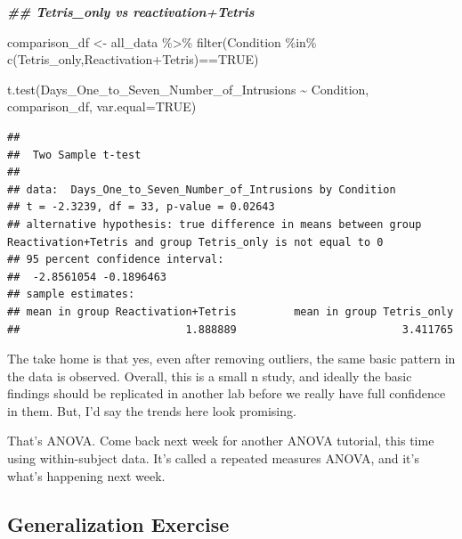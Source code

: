 \documentclass[
]{book}
\newenvironment{Shaded}{\begin{snugshade}}{\end{snugshade}}
\newcommand{\AttributeTok}[1]{\textcolor[rgb]{0.77,0.63,0.00}{#1}}
\newcommand{\ConstantTok}[1]{\textcolor[rgb]{0.00,0.00,0.00}{#1}}
\newcommand{\DocumentationTok}[1]{\textcolor[rgb]{0.56,0.35,0.01}{\textbf{\textit{#1}}}}
\newcommand{\FunctionTok}[1]{\textcolor[rgb]{0.00,0.00,0.00}{#1}}
\newcommand{\NormalTok}[1]{#1}
\newcommand{\OtherTok}[1]{\textcolor[rgb]{0.56,0.35,0.01}{#1}}
\newcommand{\SpecialCharTok}[1]{\textcolor[rgb]{0.00,0.00,0.00}{#1}}
\newcommand{\StringTok}[1]{\textcolor[rgb]{0.31,0.60,0.02}{#1}}
\begin{document}
\begin{Shaded}
\begin{Highlighting}[]
\DocumentationTok{\#\# Tetris\_only vs reactivation+Tetris}

\NormalTok{comparison\_df }\OtherTok{\textless{}{-}}\NormalTok{ all\_data }\SpecialCharTok{\%\textgreater{}\%} 
                  \FunctionTok{filter}\NormalTok{(Condition }\SpecialCharTok{\%in\%} \FunctionTok{c}\NormalTok{(}\StringTok{\textquotesingle{}Tetris\_only\textquotesingle{}}\NormalTok{,}\StringTok{\textquotesingle{}Reactivation+Tetris\textquotesingle{}}\NormalTok{)}\SpecialCharTok{==}\ConstantTok{TRUE}\NormalTok{)}
                        
\FunctionTok{t.test}\NormalTok{(Days\_One\_to\_Seven\_Number\_of\_Intrusions }\SpecialCharTok{\textasciitilde{}}\NormalTok{ Condition, }
\NormalTok{       comparison\_df,}
       \AttributeTok{var.equal=}\ConstantTok{TRUE}\NormalTok{)}
\end{Highlighting}
\end{Shaded}

\begin{verbatim}
## 
##  Two Sample t-test
## 
## data:  Days_One_to_Seven_Number_of_Intrusions by Condition
## t = -2.3239, df = 33, p-value = 0.02643
## alternative hypothesis: true difference in means between group Reactivation+Tetris and group Tetris_only is not equal to 0
## 95 percent confidence interval:
##  -2.8561054 -0.1896463
## sample estimates:
## mean in group Reactivation+Tetris         mean in group Tetris_only 
##                          1.888889                          3.411765
\end{verbatim}

The take home is that yes, even after removing outliers, the same basic pattern in the data is observed. Overall, this is a small n study, and ideally the basic findings should be replicated in another lab before we really have full confidence in them. But, I'd say the trends here look promising.

That's ANOVA. Come back next week for another ANOVA tutorial, this time using within-subject data. It's called a repeated measures ANOVA, and it's what's happening next week.

\hypertarget{generalization-exercise-7}{%
\subsection{Generalization Exercise}\label{generalization-exercise-7}}
\end{document}

